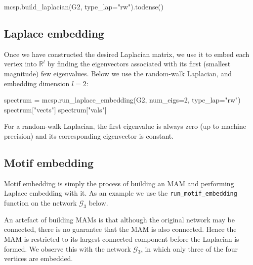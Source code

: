 \documentclass{article}
\begin{document}
\begin{pyconsole}
mcsp.build_laplacian(G2, type_lap="rw").todense()
\end{pyconsole}

\subsection{Laplace embedding}

Once we have constructed the desired Laplacian matrix,
we use it to embed each vertex into $\mathbb{R}^l$
by finding the eigenvectors associated with
its first (smallest magnitude) few eigenvalues.
Below we use the random-walk Laplacian,
and embedding dimension $l=2$:

\begin{pyconsole}
spectrum = mcsp.run_laplace_embedding(G2, num_eigs=2, type_lap="rw")
spectrum["vects"]
spectrum["vals"]
\end{pyconsole}

For a random-walk Laplacian,
the first eigenvalue is always zero (up to machine precision)
and its corresponding eigenvector is constant.

\subsection{Motif embedding}

Motif embedding is simply the process of building an MAM
and performing Laplace embedding with it.
As an example we use the
\texttt{run\_motif\_embedding}
function on the network $\mathcal{G}_3$ below.

\begin{pyconsole}
\end{pyconsole}

An artefact of building MAMs is that although the original network may
be connected, there is no guarantee that the MAM is also connected.
Hence the MAM is restricted to its largest connected component
before the Laplacian is formed.
We observe this with the network $\mathcal{G}_3$,
in which only three of the four vertices are embedded.

\begin{pyconsole}
\end{pyconsole}
\end{document}
